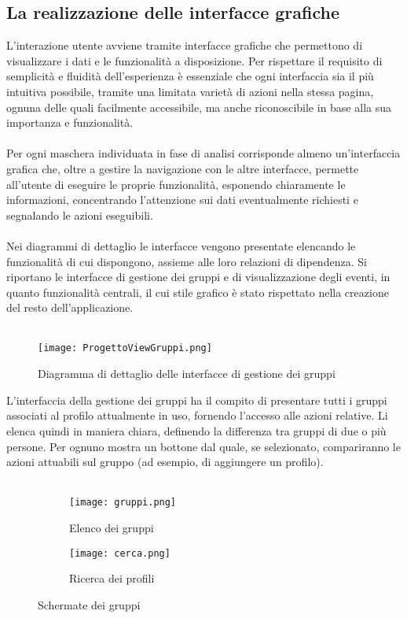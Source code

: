 \subsection{La realizzazione delle interfacce grafiche}
L'interazione utente avviene tramite interfacce grafiche
che permettono di visualizzare i dati e le funzionalità a disposizione.
Per rispettare il requisito di semplicità e fluidità dell'esperienza è essenziale che
ogni interfaccia sia il più intuitiva possibile, tramite una limitata varietà di azioni nella stessa pagina,
ognuna delle quali facilmente accessibile, ma anche riconoscibile in base alla sua importanza e funzionalità.\\
\\
Per ogni maschera individuata in fase di analisi corrisponde almeno un'interfaccia grafica che,
oltre a gestire la navigazione con le altre interfacce,
permette all'utente di eseguire le proprie funzionalità,
esponendo chiaramente le informazioni,
concentrando l'attenzione sui dati eventualmente richiesti e segnalando le azioni eseguibili.\\
\\
Nei diagrammi di dettaglio le interfacce vengono presentate elencando le funzionalità di cui dispongono,
assieme alle loro relazioni di dipendenza.
Si riportano le interfacce di gestione dei gruppi e di visualizzazione degli eventi,
in quanto funzionalità centrali, il cui stile grafico è stato rispettato nella creazione del resto dell'applicazione.\\
\\
\begin{figure}[htbp]
    \begin{center}
        \texttt{[image: ProgettoViewGruppi.png]}
        \caption{Diagramma di dettaglio delle interfacce di gestione dei gruppi}
    \end{center}
\end{figure}

L'interfaccia della gestione dei gruppi ha il compito di presentare tutti i gruppi
associati al profilo attualmente in uso,
fornendo l'accesso alle azioni relative.
Li elenca quindi in maniera chiara, definendo la differenza tra gruppi di due o più persone.
Per ognuno mostra un bottone dal quale, se selezionato, compariranno le azioni attuabili sul gruppo
(ad esempio, di aggiungere un profilo).\\
\\
\begin{figure}[htbp]
    \centering
    \begin{subfigure}{0.49\textwidth}
        \centering
        \texttt{[image: gruppi.png]}
        \caption{Elenco dei gruppi}
    \end{subfigure}
    \hfill
    \begin{subfigure}{0.49\textwidth}
        \centering
        \texttt{[image: cerca.png]}
        \caption{Ricerca dei profili}
    \end{subfigure}
    \caption{Schermate dei gruppi}
\end{figure}


